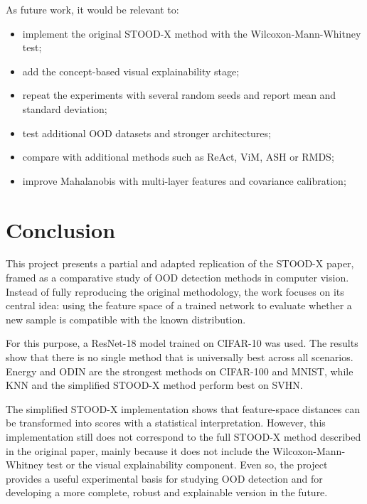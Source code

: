 \documentclass[11pt,a4paper]{article}
\begin{document}
As future work, it would be relevant to:

\begin{itemize}
    \item implement the original STOOD-X method with the Wilcoxon-Mann-Whitney test;
    \item add the concept-based visual explainability stage;
    \item repeat the experiments with several random seeds and report mean and standard deviation;
    \item test additional OOD datasets and stronger architectures;
    \item compare with additional methods such as ReAct, ViM, ASH or RMDS;
    \item improve Mahalanobis with multi-layer features and covariance calibration;
\end{itemize}

\section{Conclusion}

This project presents a partial and adapted replication of the STOOD-X paper, framed as a comparative study of OOD detection methods in computer vision.
Instead of fully reproducing the original methodology, the work focuses on its central idea: using the feature space of a trained network to evaluate whether a new sample is compatible with the known distribution.

For this purpose, a ResNet-18 model trained on CIFAR-10 was used.
The results show that there is no single method that is universally best across all scenarios.
Energy and ODIN are the strongest methods on CIFAR-100 and MNIST, while KNN and the simplified STOOD-X method perform best on SVHN.

The simplified STOOD-X implementation shows that feature-space distances can be transformed into scores with a statistical interpretation.
However, this implementation still does not correspond to the full STOOD-X method described in the original paper, mainly because it does not include the Wilcoxon-Mann-Whitney test or the visual explainability component.
Even so, the project provides a useful experimental basis for studying OOD detection and for developing a more complete, robust and explainable version in the future.
\end{document}

